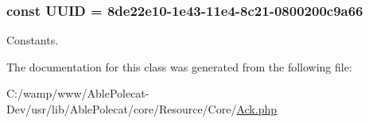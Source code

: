 \subsubsection[{U\+U\+I\+D}]{\setlength{\rightskip}{0pt plus 5cm}const U\+U\+I\+D = \textquotesingle{}8de22e10-\/1e43-\/11e4-\/8c21-\/0800200c9a66\textquotesingle{}}\label{class_able_polecat___resource___core___ack_a74b892c8c0b86bf9d04c5819898c51e7}
Constants. 

The documentation for this class was generated from the following file\+:\begin{DoxyCompactItemize}
\item 
C\+:/wamp/www/\+Able\+Polecat-\/\+Dev/usr/lib/\+Able\+Polecat/core/\+Resource/\+Core/\hyperlink{_ack_8php}{Ack.\+php}\end{DoxyCompactItemize}
